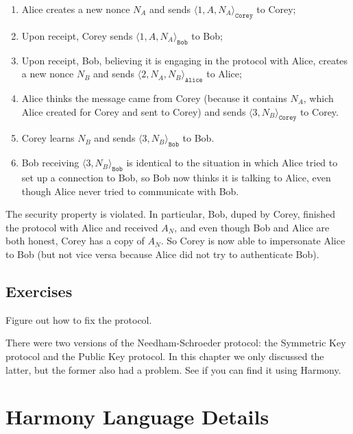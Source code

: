 \documentclass{report}
\begin{document}
{\begin{enumerate}
\item Alice creates a new nonce $N_A$ and sends $\langle 1, A, N_A \rangle_\mathtt{Corey}$
to Corey;
\item Upon receipt, Corey sends $\langle 1, A, N_A \rangle_\mathtt{Bob}$ to Bob;
\item Upon receipt, Bob, believing it is engaging in the protocol with Alice,
creates a new nonce $N_B$ and sends
$\langle 2, N_A, N_B \rangle_\mathtt{Alice}$ to Alice;
\item Alice thinks the message came from Corey (because it contains $N_A$, which
Alice created for Corey and sent to Corey) and
sends $\langle 3, N_B \rangle_\mathtt{Corey}$ to Corey.
\item Corey learns $N_B$ and sends $\langle 3, N_B \rangle_\mathtt{Bob}$ to Bob.
\item Bob receiving $\langle 3, N_B \rangle_\mathtt{Bob}$ is identical to the
situation in which Alice tried to set up a connection to Bob,
so Bob now thinks it is talking to Alice, even though Alice never tried to
communicate with Bob.
\end{enumerate}
The security property is violated.  In particular, Bob, duped by Corey, finished
the protocol with Alice and received $A_N$, and even though Bob and Alice
are both honest, Corey has a copy of $A_N$.  So Corey is now able to impersonate
Alice to Bob (but not vice versa because Alice did not try to authenticate Bob).

\section*{Exercises}
\begin{problems}
\item Figure out how to fix the protocol.
\item There were two versions of the Needham-Schroeder protocol: the
Symmetric Key protocol and the Public Key protocol.  In this chapter
we only discussed the latter, but the former also had a problem.  See
if you can find it using Harmony.
\end{problems}




\appendix

\chapter{Harmony Language Details}

}
\end{document}
